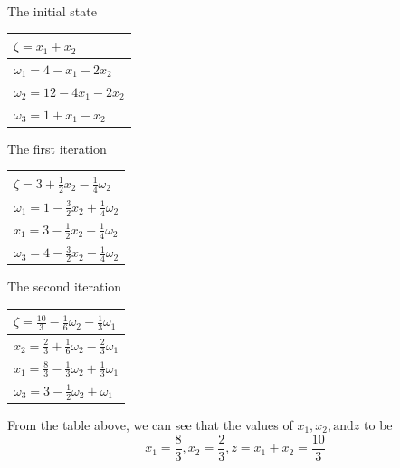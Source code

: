 \documentclass[a4paper,10pt]{article}
\begin{document}
\begin{enumerate}
\begin{enumerate}
{\begin{enumerate}
                The initial state
                \begin{center}
                    \begin{tabular}{ l } 
                        $ \zeta = x_1 + x_2 $ \\
                        \hline
                        $ \omega_1 = 4 - x_1 - 2x_2 $ \\
                        $ \omega_2 = 12 - 4x_1 - 2x_2 $ \\
                        $ \omega_3 = 1 + x_1 - x_2 $
                    \end{tabular}
                \end{center}
                
                The first iteration
                \begin{center}
                    \begin{tabular}{ l } 
                        $\zeta = 3 + \frac{1}{2}x_2 - \frac{1}{4}\omega_2$ \\
                        \hline
                        $\omega_1 = 1 - \frac{3}{2}x_2 + \frac{1}{4}\omega_2$ \\
                        $x_1 = 3 - \frac{1}{2}x_2 - \frac{1}{4}\omega_2$ \\
                        $\omega_3 = 4 - \frac{3}{2}x_2 - \frac{1}{4}\omega_2$ \\
                    \end{tabular}
                \end{center}
    
                The second iteration
                \begin{center}
                    \begin{tabular}{ l } 
                        $\zeta = \frac{10}{3} - \frac{1}{6}\omega_2 - \frac{1}{3}\omega_1$ \\
                        \hline
                        $x_2 = \frac{2}{3} + \frac{1}{6}\omega_2 - \frac{2}{3}\omega_1$ \\
                        $x_1 = \frac{8}{3} - \frac{1}{3}\omega_2 + \frac{1}{3}\omega_1$ \\
                        $\omega_3 = 3 - \frac{1}{2}\omega_2 + \omega_1$ \\
                    \end{tabular}
                \end{center}
    
                From the table above, we can see that the values of $x_1, x_2, \text{and} z$ to be 
                \[
                    x_1 = \frac{8}{3}, x_2 = \frac{2}{3}, z = x_1 + x_2 =  \frac{10}{3}
                \]
    

\end{enumerate}}
\end{enumerate}
\end{enumerate}
\end{document}
